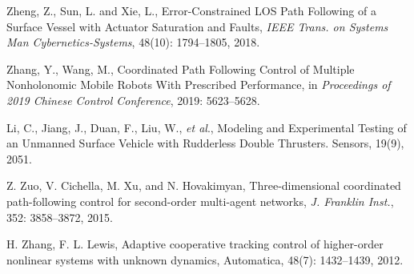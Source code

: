 \documentclass[english]{cccconf}
\begin{document}
\begin{thebibliography}{0}
 Zheng, Z., Sun, L. and Xie, L., Error-Constrained LOS Path Following of a Surface Vessel with Actuator Saturation and Faults, \emph{IEEE Trans. on Systems Man Cybernetics-Systems}, 48(10): 1794--1805, 2018.

 Zhang, Y., Wang, M., Coordinated Path Following Control of Multiple Nonholonomic Mobile Robots With Prescribed Performance, in \emph{Proceedings of 2019 Chinese Control Conference}, 2019: 5623--5628. 

 Li, C., Jiang, J., Duan, F., Liu, W., \emph{et al}., Modeling and Experimental Testing of an Unmanned Surface Vehicle with Rudderless Double Thrusters. Sensors, 19(9), 2051.

 Z. Zuo, V. Cichella, M. Xu, and N. Hovakimyan, Three-dimensional coordinated path-following control for second-order multi-agent networks, \emph{J. Franklin Inst.}, 352: 3858--3872, 2015.

 H. Zhang, F. L. Lewis, Adaptive cooperative tracking control of higher-order nonlinear systems with unknown dynamics, Automatica, 48(7): 1432--1439, 2012.

\end{thebibliography}
\end{document}
